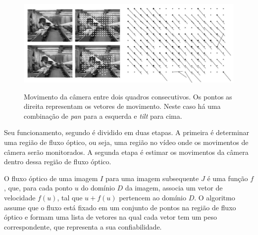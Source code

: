 \begin{figure}[h]
	\centering
	\caption{Movimento da câmera entre dois quadros consecutivos. Os pontos as direita representam os vetores de movimento. Neste caso há uma combinação de \textit{pan} para a esquerda e \textit{tilt} para cima.}
	\includegraphics[width=\textwidth]{dados/figuras/cameramotion-example}
	\label{fig:example_cameramotion}
\end{figure}

Seu funcionamento, segundo  é dividido em duas etapas. A primeira é determinar uma região de fluxo óptico, ou seja, uma região no vídeo onde os movimentos de câmera serão monitorados. A segunda etapa é estimar os movimentos da câmera dentro dessa região de fluxo óptico.

O fluxo óptico de uma imagem $I$ para uma imagem subsequente $J$ é uma função $f$, que, para cada ponto $u$ do domínio $D$ da imagem, associa um vetor de velocidade $f(u)$, tal que $u + f(u)$ pertencem ao domínio $D$. O algoritmo assume que o fluxo está fixado em um conjunto de pontos na região de fluxo óptico e formam uma lista de vetores na qual cada vetor tem um peso correspondente, que representa a sua confiabilidade. 






